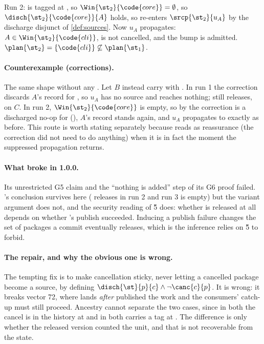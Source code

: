 Run 2:  is tagged at \Head{}, so $\Win{\st_2}{\code{core}} =
\emptyset$, so $\disch{\st_2}{\code{core}}{A}$ holds, so  re-enters
$\srcp{\st_2}{u_A}$ by the discharge disjunct of \cref{def:sources}. Now $u_A$
propagates: $A \in \Win{\st_2}{\code{cli}}$,  is not cancelled, and
the bump is admitted. $\plan{\st_2} = \{\code{cli}\} \not\subseteq
\plan{\st_1}$.

\paragraph{Counterexample (corrections).} The same shape without any
. Let $B$ instead carry  with
. In run 1 the correction discards $A$'s record for
, so $u_A$ has no source and reaches nothing;  still
releases, on $C$. In run 2, $\Win{\st_2}{\code{core}}$ is empty, so by
 the correction is a discharged no-op for 
(), $A$'s record stands again, and $u_A$ propagates to 
exactly as before. This route is worth stating separately because 
reads as reassurance (the correction did not need to do anything) when it
is in fact the moment the suppressed propagation returns.

\paragraph{What broke in 1.0.0.} Its unrestricted G5 claim and the ``nothing is added'' step of its G6 proof failed. 's conclusion survives here (
releases in run 2 and run 3 is empty) but the variant argument does not, and
the security reading of \G{5} does: whether  is released at all
depends on whether 's publish succeeded. Inducing a publish failure
changes the set of packages a commit eventually releases, which is the
inference  relies on \G{5} to forbid.

\paragraph{The repair, and why the obvious one is wrong.} The tempting fix is
to make cancellation sticky, never letting a cancelled package become a source,
by defining $\disch{\st}{p}{c} \land \lnot\canc{c}{p}$. It is wrong: it
breaks \SPEC{} vector 72, where  lands \emph{after}
 published the work and the consumers' catch-up must still proceed.
Ancestry cannot separate the two cases, since in both the cancel is in the
history at \Head{} and in both  carries a tag at \Head{}. The
difference is only whether the released version counted the unit, and that is
not recoverable from the state.


